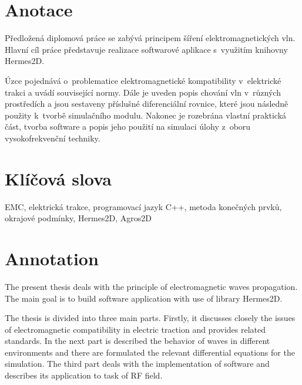 
\renewcommand\thepage{}


\section*{Anotace}
Předložená diplomová práce se zabývá principem šíření elektromagnetických vln. Hlavní cíl práce představuje realizace softwarové aplikace s~využitím knihovny Hermes2D.

Úzce pojednává o~problematice elektromagnetické kompatibility v~elektrické trakci a uvádí související normy. Dále je uveden popis chování vln v~různých prostředích a jsou sestaveny příslušné diferenciální rovnice, které jsou následně použity k~tvorbě simulačního modulu. Nakonec je rozebrána vlastní praktická část, tvorba software a popis jeho použití na simulaci úlohy z~oboru vysokofrekvenční techniky.

\section*{Klíčová slova}
EMC, elektrická trakce, programovací jazyk C++, metoda konečných prvků, okrajové podmínky, Hermes2D, Agros2D

\bigskip

\section*{Annotation}
The present thesis deals with the principle of electromagnetic waves propagation. The main goal is to build software application with use of library Hermes2D.

The thesis is divided into three main parts. Firstly, it discusses closely the issues of electromagnetic compatibility in electric traction and provides related standards.
In the next part is described the behavior of waves in different environments and there are formulated the relevant differential equations for the simulation. The third part deals with the implementation of software and describes its application to task of RF field.

